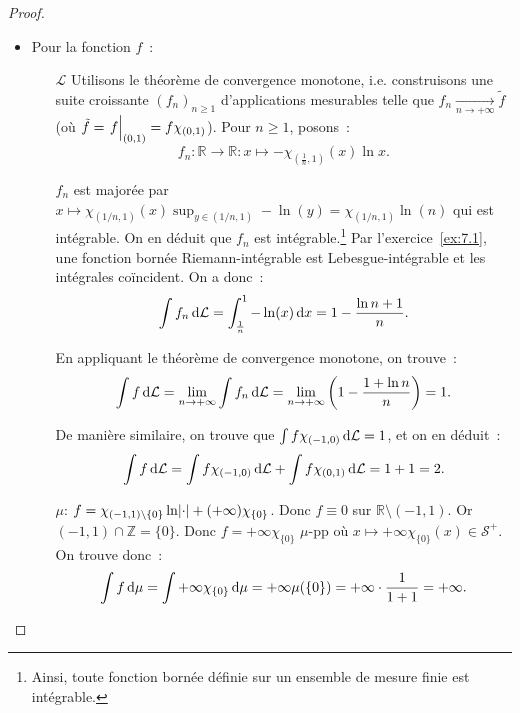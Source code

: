 \documentclass{article}
\theoremstyle{definition}
\newcommand{\restr}[2]{\left.#1\vphantom{\big|}\right|_{#2}}
\newcommand{\pinfty}{{+\infty}}
\newcommand{\Z}{{\mathbb Z}}
\newcommand{\R}{{\mathbb R}}
\begin{document}
\begin{proof}~
\begin{itemize}
	\item Pour la fonction $f$~:
	\begin{itemize}
		\item[$\mathcal L$] Utilisons le théorème de convergence monotone, i.e. construisons une suite croissante $(f_n)_{n \geq 1}$ d'applications mesurables telle que
		$f_n \xrightarrow[n \to \pinfty]{} \tilde f$ (où $\tilde f = \restr f{(0, 1)} = f\chi_{(0, 1)}$). Pour $n \geq 1$, posons~:
		\[f_n : \R \to \R : x \mapsto -\chi_{(\frac 1n, 1)}(x)\ln x.\]

		$f_n$ est majorée par $x \mapsto \chi_{(1/n, 1)}(x)\sup_{y \in (1/n, 1)}-\ln(y) = \chi_{(1/n, 1)}\ln(n)$ qui est intégrable. On en déduit que $f_n$ est intégrable.\footnote{
		Ainsi, toute fonction bornée définie sur un ensemble de mesure finie est intégrable.} Par l'exercice~\ref{ex:7.1}, une fonction bornée Riemann-intégrable est Lebesgue-intégrable et
		les intégrales coïncident. On a donc~:
		\[\int f_n\dif\mathcal L = \int_{\frac 1n}^1-\ln(x)\dif x = 1 - \frac {\ln n+1}n.\]

		En appliquant le théorème de convergence monotone, on trouve~:
		\[\int f\dif\mathcal L = \lim_{n \to \pinfty}\int f_n\dif\mathcal L = \lim_{n \to \pinfty}\left(1 - \frac {1+\ln n}n\right) = 1.\]

		De manière similaire, on trouve que $\int f\chi_{(-1, 0)}\dif\mathcal L = 1$, et on en déduit~:
		\[\int f\dif\mathcal L = \int f\chi_{(-1, 0)}\dif\mathcal L + \int f\chi_{(0, 1)}\dif\mathcal L = 1+1 = 2.\]
		\item[$\mu$:]       $f = \chi_{(-1, 1) \setminus \{0\}}\ln\abs \cdot + (\pinfty)\chi_{\{0\}}$. Donc $f \equiv 0$ sur $\R \setminus (-1, 1)$. Or $(-1, 1) \cap \Z = \{0\}$.
		Donc $f = \pinfty\chi_{\{0\}}$ $\mu$-pp où $x \mapsto \pinfty\chi_{\{0\}}(x) \in \mathcal S^+$. On trouve donc~:
		\[\int f\dif\mu = \int \pinfty\chi_{\{0\}}\dif\mu = \pinfty\mu(\{0\}) = \pinfty \cdot \frac 1{1+1} = \pinfty.\]


\end{itemize}
\end{itemize}
\end{proof}
\end{document}

